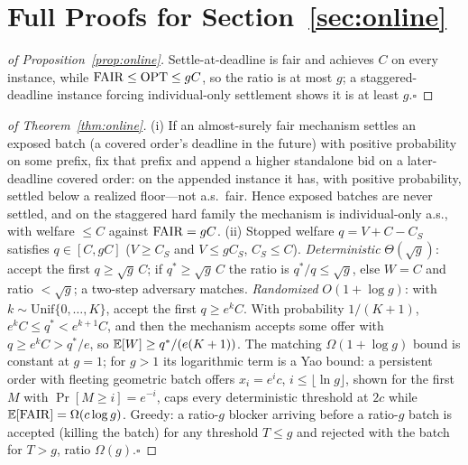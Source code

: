 \section{Full Proofs for Section~\ref{sec:online}}

\begin{proof}[of Proposition~\ref{prop:online}]
Settle-at-deadline is fair and achieves $C$ on every instance, while
$\mathrm{FAIR}\le\mathrm{OPT}\le gC$, so the ratio is at most $g$; a staggered-deadline
instance forcing individual-only settlement shows it is at least $g$.\hfill$\square$
\end{proof}

\begin{proof}[of Theorem~\ref{thm:online}]
(i) If an almost-surely fair mechanism settles an exposed batch (a
covered order's deadline in the future) with positive probability on some
prefix, fix that prefix and append a higher standalone bid on a
later-deadline covered order: on the appended instance it has, with
positive probability, settled below a realized floor---not a.s.\ fair.
Hence exposed batches are never settled, and on the staggered hard family
the mechanism is individual-only a.s., with welfare $\le C$ against
$\mathrm{FAIR}=gC$.
(ii) Stopped welfare $q=V+C-C_S$ satisfies $q\in[C,gC]$ ($V\ge C_S$ and
$V\le gC_S$, $C_S\le C$). \emph{Deterministic} $\Theta(\sqrt g)$: accept
the first $q\ge\sqrt g\,C$; if $q^\ast\ge\sqrt g\,C$ the ratio is
$q^\ast/q\le\sqrt g$, else $W=C$ and ratio $<\sqrt g$; a two-step
adversary matches. \emph{Randomized} $O(1+\log g)$: with
$k\sim\mathrm{Unif}\{0,\dots,K\}$, accept the first $q\ge e^kC$. With
probability $1/(K+1)$, $e^kC\le q^\ast<e^{k+1}C$, and then the mechanism
accepts some offer with $q\ge e^kC>q^\ast/e$, so
$\mathbb{E}[W]\ge q^\ast/(e(K+1))$. The matching $\Omega(1+\log g)$ bound is
constant at $g=1$; for $g>1$ its logarithmic term is a Yao bound:
a persistent order with fleeting geometric batch offers $x_i=e^ic$,
$i\le\lfloor\ln g\rfloor$, shown for the first $M$ with
$\Pr[M\ge i]=e^{-i}$, caps every deterministic threshold at $2c$ while
$\mathbb{E}[\mathrm{FAIR}]=\Omega(c\log g)$. Greedy: a ratio-$g$ blocker arriving before a
ratio-$g$ batch is accepted (killing the batch) for any threshold
$T\le g$ and rejected with the batch for $T>g$, ratio $\Omega(g)$.\hfill$\square$
\end{proof}

